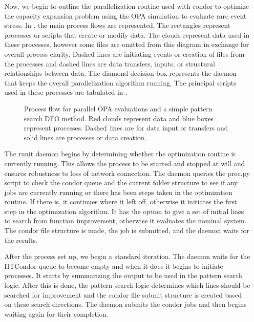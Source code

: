 Now, we begin to outline the parallelization routine used with condor to optimize the capacity expansion problem using the OPA simulation to evaluate rare event stress.  In , the main process flows are represented.  The rectangles represent processes or scripts that create or modify data.  The clouds represent data used in these processes, however some files are omitted from this diagram in exchange for overall process clarity.  Dashed lines are initiating events or creation of files from the processes and dashed lines are data transfers, inputs, or structural relationships between data.  The diamond decision box represents the daemon that keeps the overall parallelization algorithm running.  The principal scripts used in these processes are tabulated in .

\linespread{1}
\begin{figure}
\centering
\footnotesize

\caption[Process flow for parallel OPA evaluations]{Process flow for parallel OPA evaluations and a simple pattern search DFO method.  Red clouds represent data and blue boxes represent processes.  Dashed lines are for data input or transfers and solid lines are processes or data creation. }
\label{fig:parallel}
\end{figure}
\linespread{2}

The runit daemon begins by determining whether the optimization routine is currently running.  This allows the process to be started and stopped at will and ensures robustness to loss of network connection.  The daemon queries the proc.py script to check the condor queue and the current folder structure to see if any jobs are currently running or there has been steps taken in the optimization routine.  If there is, it continues where it left off, otherwise it initiates the first step in the optimization algorithm.  It has the option to give a set of initial lines to search from function improvement, otherwise it evaluates the nominal system.  The condor file structure is made, the job is submitted, and the daemon waits for the results.
%

After the process set up, we begin a standard iteration.  The daemon waits for the HTCondor queue to become empty and when it does it begins to initiate processes.  It starts by summarizing the output to be used in the pattern search logic.  After this is done, the pattern search logic determines which lines should be searched for improvement and the condor file submit structure is created based on these search directions.  The daemon submits the condor jobs and then begins waiting again for their completion.

